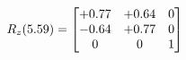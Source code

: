 \documentclass[preview]{standalone}
\begin{document}
\begin{align*}
\special{dvisvgm:raw <g id='unique000'>}R_{z}(5.59) = \begin{bmatrix}+0.77 & +0.64 & 0 \\-0.64 & +0.77 & 0 \\0 & 0 & 1\end{bmatrix}\special{dvisvgm:raw </g>}
\end{align*}
\end{document}
